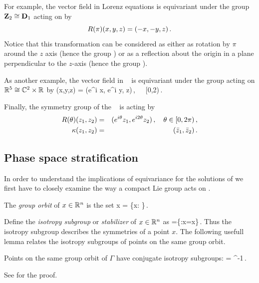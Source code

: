 For example, the vector field in Lorenz equations   is equivariant under the group
$\mathbf{Z}_2\cong\mathbf{D}_1$ acting on  by
\[
	R(\pi)(x,y,z) = (-x,-y,z)\,.
\]
Notice that this transformation can be considered as either as rotation by $\pi$ around the $z$ axis (hence the
group ) or as a reflection about the origin in a plane perpendicular to the $z$-axis (hence the group ).

As another example, the vector field in \CLe~  is equivariant under the group  acting on $\mathbb{R}^{5}\cong \mathbb{C}^{2}\times \mathbb{R}^{}$
by
\beq
 \Rot{\theta} (x,y,z) = (e^{i\theta} x, e^{i\theta} y, z)\,,\ \ \  \theta\in[0,2\pi)\,.
 \label{eq:RotCLe}
\eeq

Finally, the symmetry group of the \AGHe~ is  acting by
\begin{eqnarray*}
  R(\theta)(z_1,z_2) &=& (e^{i\theta} z_1, e^{i 2\theta} z_2)\,,\ \ \  \theta\in[0,2\pi)\,,\\
  \kappa(z_1,z_2) &=& (\bar{z}_1,\bar{z}_2)\,.
\end{eqnarray*}


\subsection{Phase space stratification}

In order to understand the implications of equivariance for the solutions
of  we first have to closely examine the way a compact 
Lie group acts on .

 The \emph{group orbit} of $x\in\mathbb{R}^{n}$ is the set
\beq
	\Gamma x = \{\gamma x: \gamma\in\Gamma\}\,.
\eeq

 Define the \emph{isotropy subgroup} or \emph{stabilizer} of $x\in\mathbb{R}^{n}$ as
\beq
	=\{\gamma\in\Gamma:\gamma x=x\}\,.
\eeq
Thus the isotropy subgroup describes the symmetries of a point $x$. The following usefull lemma
relates the isotropy subgroups of points on the same group orbit.

\begin{lemma}
\label{lm:stabGorbit}
Points on the same group orbit of $\Gamma$ have conjugate isotropy subgroups:
\beq
	=\gamma {} \gamma^{-1}\,.
\eeq
\end{lemma}
See  for the proof.

